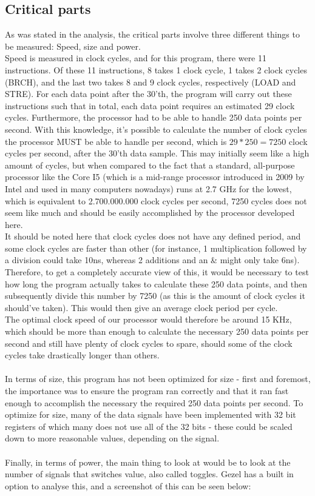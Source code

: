 \documentclass[12pt,a4paper]{article}
\begin{document}
\subsection{Critical parts}
	As was stated in the analysis, the critical parts involve three different things to be measured: Speed, size and power.\\
	Speed is measured in clock cycles, and for this program, there were 11 instructions. Of these 11 instructions, 8 takes 1 clock cycle, 1 takes 2 clock cycles (BRCH), and the last two takes 8 and 9 clock cycles, respectively (LOAD and STRE). For each data point after the 30'th, the program will carry out these instructions such that in total, each data point requires an estimated 29 clock cycles. Furthermore, the processor had to be able to handle 250 data points per second. With this knowledge, it's possible to calculate the number of clock cycles the processor MUST be able to handle per second, which is $29*250=7250$ clock cycles per second, after the 30'th data sample. This may initially seem like a high amount of cycles, but when compared to the fact that a standard, all-purpose processor like the Core I5 (which is a mid-range processor introduced in 2009 by Intel and used in many computers nowadays) runs at 2.7 GHz for the lowest, which is equivalent to 2.700.000.000 clock cycles per second, 7250 cycles does not seem like much and should be easily accomplished by the processor developed here.\\
	It should be noted here that clock cycles does not have any defined period, and some clock cycles are faster than other (for instance, 1 multiplication followed by a division could take 10ns, whereas 2 additions and an \& might only take 6ns). Therefore, to get a completely accurate view of this, it would be necessary to test how long the program actually takes to calculate these 250 data points, and then subsequently divide this number by 7250 (as this is the amount of clock cycles it should've taken). This would then give an average clock period per cycle.\\
	The optimal clock speed of our processor would therefore be around 15 KHz, which should be more than enough to calculate the necessary 250 data points per second and still have plenty of clock cycles to spare, should some of the clock cycles take drastically longer than others.\\
	\\
	In terms of size, this program has not been optimized for size - first and foremost, the importance was to ensure the program ran correctly and that it ran fast enough to accomplish the necessary the required 250 data points per second. To optimize for size, many of the data signals have been implemented with 32 bit registers of which many does not use all of the 32 bits - these could be scaled down to more reasonable values, depending on the signal.\\
	\\
	Finally, in terms of power, the main thing to look at would be to look at the number of signals that switches value, also called toggles. Gezel has a built in option to analyse this, and a screenshot of this can be seen below:\
\end{document}
